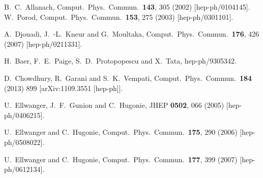 \documentclass[final,3p,11pt,pdflatex]{elsarticle}
\begin{document}
\begin{thebibliography}{100}
  B.~C.~Allanach,
  Comput.\ Phys.\ Commun.\  {\bf 143}, 305 (2002)
  [hep-ph/0104145].
  W.~Porod,
  Comput.\ Phys.\ Commun.\  {\bf 153}, 275 (2003)
  [hep-ph/0301101].

  A.~Djouadi, J.~-L.~Kneur and G.~Moultaka,
  Comput.\ Phys.\ Commun.\  {\bf 176}, 426 (2007)
  [hep-ph/0211331].

  H.~Baer, F.~E.~Paige, S.~D.~Protopopescu and X.~Tata,
  hep-ph/9305342.

  D.~Chowdhury, R.~Garani and S.~K.~Vempati,
  Comput.\ Phys.\ Commun.\  {\bf 184} (2013) 899
  [arXiv:1109.3551 [hep-ph]].

  U.~Ellwanger, J.~F.~Gunion and C.~Hugonie,
  JHEP {\bf 0502}, 066 (2005)
  [hep-ph/0406215].

  U.~Ellwanger and C.~Hugonie,
  Comput.\ Phys.\ Commun.\  {\bf 175}, 290 (2006)
  [hep-ph/0508022].


  U.~Ellwanger and C.~Hugonie,
  Comput.\ Phys.\ Commun.\  {\bf 177}, 399 (2007)
  [hep-ph/0612134].


\end{thebibliography}
\end{document}
